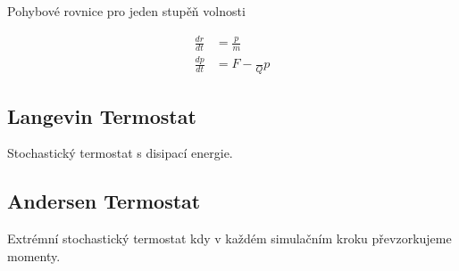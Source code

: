 
Pohybové rovnice pro jeden stupěň volnosti

\begin{align}
    \frac{dr}{dt} & = \frac{p}{m} \\
    \frac{dp}{dt} & = F -\frac{}{Q} p
\end{align}

\subsection{Langevin Termostat}

Stochastický termostat s disipací energie.

\subsection{Andersen Termostat}
Extrémní stochastický termostat kdy v každém simulačním kroku převzorkujeme momenty.


